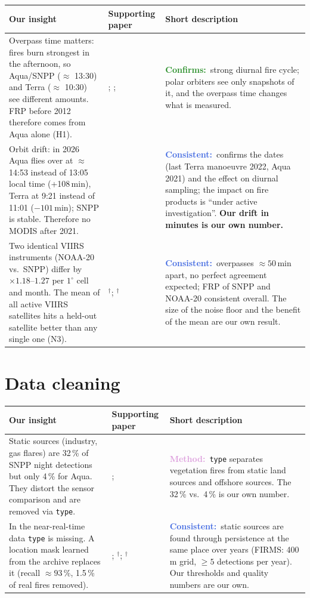 \documentclass[10pt,a4paper]{article}
\newcommand{\fitlabel}[2]{\textcolor{#1}{\textbf{#2}}}
\newcommand{\confirms}{\fitlabel{ForestGreen}{Confirms:}}
\newcommand{\consistent}{\fitlabel{RoyalBlue}{Consistent:}}
\newcommand{\method}{\fitlabel{Plum}{Method:}}
\newcommand{\abs}{$^\dagger$}   %
\newenvironment{insighttable}{%
  \small
  \begin{longtable}{L{0.36\textwidth} L{0.17\textwidth} L{0.41\textwidth}}
  \toprule
  \textbf{Our insight} & \textbf{Supporting paper} & \textbf{Short description} \\
  \midrule
  \endhead
  \bottomrule
  \endfoot
}{%
  \end{longtable}
}
\begin{document}
\begin{insighttable}
Overpass time matters: fires burn strongest in the afternoon, so Aqua/SNPP ($\approx$ 13:30) and Terra
($\approx$ 10:30) see different amounts. FRP before 2012 therefore comes from Aqua alone (H1).
& \citet{giglio2006}; \citet{freeborn2011}; \citet{andela2015}
& \confirms\ strong diurnal fire cycle; polar orbiters see only snapshots of it, and the overpass time
changes what is measured. \\

Orbit drift: in 2026 Aqua flies over at $\approx$ 14:53 instead of 13:05 local time (+108\,min), Terra at 9:21
instead of 11:01 ($-101$\,min); SNPP is stable. Therefore no MODIS after 2021.
& \citet{giglio2025}
& \consistent\ confirms the dates (last Terra manoeuvre 2022, Aqua 2021) and the effect on diurnal sampling;
the impact on fire products is ``under active investigation''. \textbf{Our drift in minutes is our own number.} \\

Two identical VIIRS instruments (NOAA-20 vs.\ SNPP) differ by $\times 1.18$--$1.27$ per $1^\circ$ cell and month.
The mean of all active VIIRS satellites hits a held-out satellite better than any single one (N3).
& \citet{csiszar2018}\abs; \citet{zhou2023}\abs
& \consistent\ overpasses $\approx 50$\,min apart, no perfect agreement expected; FRP of SNPP and NOAA-20
consistent overall. The size of the noise floor and the benefit of the mean are our own result. \\
\end{insighttable}

\section{Data cleaning}

\begin{insighttable}
Static sources (industry, gas flares) are 32\,\% of SNPP night detections but only 4\,\% for Aqua. They distort
the sensor comparison and are removed via \texttt{type}.
& \citet{giglio2016}; \citet{firms_type}
& \method\ \texttt{type} separates vegetation fires from static land sources and offshore sources.
The 32\,\% vs.\ 4\,\% is our own number. \\

In the near-real-time data \texttt{type} is missing. A location mask learned from the archive replaces it
(recall $\approx 93$\,\%, 1.5\,\% of real fires removed).
& \citet{firms_type}; \citet{ma2020}\abs; \citet{gao2026}\abs
& \consistent\ static sources are found through persistence at the same place over years (FIRMS: 400\,m grid,
$\geq 5$ detections per year). Our thresholds and quality numbers are our own. \\
\end{insighttable}
\end{document}

